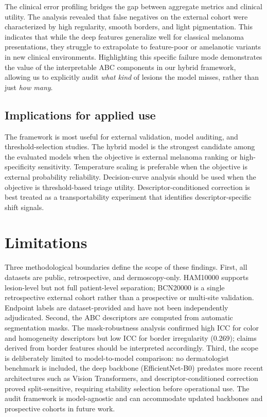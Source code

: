 \documentclass[preprint,12pt]{elsarticle}
\begin{document}
The clinical error profiling bridges the gap between aggregate metrics and clinical utility. The analysis revealed that false negatives on the external cohort were characterized by high regularity, smooth borders, and light pigmentation. This indicates that while the deep features generalize well for classical melanoma presentations, they struggle to extrapolate to feature-poor or amelanotic variants in new clinical environments. Highlighting this specific failure mode demonstrates the value of the interpretable ABC components in our hybrid framework, allowing us to explicitly audit \textit{what kind} of lesions the model misses, rather than just \textit{how many}.

\subsection{Implications for applied use}

The framework is most useful for external validation, model auditing, and threshold-selection studies. The hybrid model is the strongest candidate among the evaluated models when the objective is external melanoma ranking or high-specificity sensitivity. Temperature scaling is preferable when the objective is external probability reliability. Decision-curve analysis should be used when the objective is threshold-based triage utility. Descriptor-conditioned correction is best treated as a transportability experiment that identifies descriptor-specific shift signals.

\section{Limitations}

Three methodological boundaries define the scope of these findings. First, all datasets are public, retrospective, and dermoscopy-only. HAM10000 supports lesion-level but not full patient-level separation; BCN20000 is a single retrospective external cohort rather than a prospective or multi-site validation. Endpoint labels are dataset-provided and have not been independently adjudicated. Second, the ABC descriptors are computed from automatic segmentation masks. The mask-robustness analysis confirmed high ICC for color and homogeneity descriptors but low ICC for border irregularity (0.269); claims derived from border features should be interpreted accordingly. Third, the scope is deliberately limited to model-to-model comparison: no dermatologist benchmark is included, the deep backbone (EfficientNet-B0) predates more recent architectures such as Vision Transformers, and descriptor-conditioned correction proved split-sensitive, requiring stability selection before operational use. The audit framework is model-agnostic and can accommodate updated backbones and prospective cohorts in future work.
\end{document}
